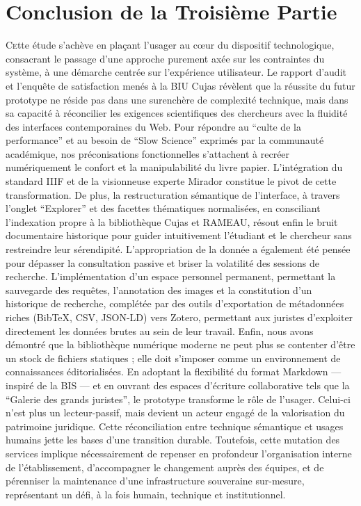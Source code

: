 \documentclass[12pt,twoside]{book}
\begin{document}





\section*{Conclusion de la Troisième Partie}

\lettrine{C}ette étude s'achève en plaçant l’usager au cœur du dispositif technologique, consacrant le passage d’une approche purement axée sur les contraintes du système, à une démarche centrée sur l’expérience utilisateur. Le rapport d'audit et l’enquête de satisfaction menés à la \ac{BIU Cujas} révèlent que la réussite du futur prototype ne réside pas dans une surenchère de complexité technique, mais dans sa capacité à réconcilier les exigences scientifiques des chercheurs avec la fluidité des interfaces contemporaines du Web.
Pour répondre au \enquote{culte de la performance} et au besoin de \enquote{Slow Science} exprimés par la communauté académique, nos préconisations fonctionnelles s'attachent à recréer numériquement le confort et la manipulabilité du livre papier. L’intégration du standard \ac{IIIF} et de la visionneuse experte Mirador constitue le pivot de cette transformation. De plus, la restructuration sémantique de l’interface, à travers l’onglet \enquote{Explorer} et des facettes thématiques normalisées, en consciliant l'indexation propre à la bibliothèque Cujas et RAMEAU, résout enfin le bruit documentaire historique pour guider intuitivement l’étudiant et le chercheur sans restreindre leur sérendipité.
L’appropriation de la donnée a également été pensée pour dépasser la consultation passive et briser la volatilité des sessions de recherche. L'implémentation d'un espace personnel permanent, permettant la sauvegarde des requêtes, l'annotation des images et la constitution d'un historique de recherche, complétée par des outils d’exportation de métadonnées riches (BibTeX, CSV, JSON-LD) vers Zotero, permettant aux juristes d'exploiter directement les données brutes au sein de leur travail.
Enfin, nous avons démontré que la bibliothèque numérique moderne ne peut plus se contenter d'être un stock de fichiers statiques ; elle doit s’imposer comme un environnement de connaissances éditorialisées. En adoptant la flexibilité du format Markdown — inspiré de la BIS — et en ouvrant des espaces d'écriture collaborative tels que la \enquote{Galerie des grands juristes}, le prototype transforme le rôle de l'usager. Celui-ci n'est plus un lecteur-passif, mais devient un acteur engagé de la valorisation du patrimoine juridique.
Cette réconciliation entre technique sémantique et usages humains jette les bases d’une transition durable. Toutefois, cette mutation des services implique nécessairement de repenser en profondeur l’organisation interne de l’établissement, d'accompagner le changement auprès des équipes, et de pérenniser la maintenance d'une infrastructure souveraine sur-mesure, représentant un défi, à la fois humain, technique et institutionnel.
\end{document}
